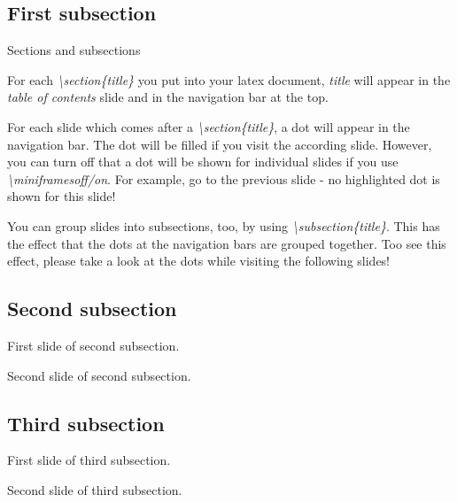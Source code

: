 \subsection{First subsection}

\begin{frame}{Sections and subsections}

  For each \textit{\textbackslash section\{title\}} you put into your latex document, \textit{title} will appear in the \textit{table of contents} slide and in the navigation bar at the top. \\
  
  \vspace{0.4cm}
  
  For each slide which comes after a \textit{\textbackslash section\{title\}}, a dot will appear in the navigation bar. The dot will be filled if you visit the according slide. However, you can turn  off that a dot will be shown for individual slides if you use \textit{\textbackslash miniframesoff/on}. For example, go to the previous slide - no highlighted dot is shown for this slide!
    
  \vspace{0.4cm}
  
  You can group slides into subsections, too, by using \textit{\textbackslash subsection\{title\}}. This has the effect that the dots at the navigation bars are grouped together. Too see this effect, please take a look at the dots while visiting the following slides!
  
\end{frame}

\subsection{Second subsection}

\begin{frame}{}

  First slide of second subsection.

\end{frame}

\begin{frame}{}

  Second slide of second subsection.

\end{frame}

\subsection{Third subsection}

\begin{frame}{}

  First slide of third subsection.

\end{frame}

\begin{frame}{}

  Second slide of third subsection.

\end{frame}